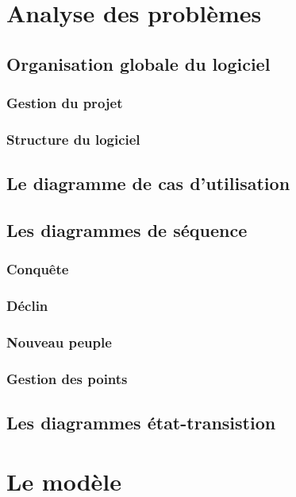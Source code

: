 \documentclass[11pt]{report}
\begin{document}
\chapter{Analyse des problèmes}

	\section{Organisation globale du logiciel}

		\subsection{Gestion du projet}

		\subsection{Structure du logiciel}

	\section{Le diagramme de cas d'utilisation}

	\section{Les diagrammes de séquence}

		\subsection{Conquête}

		\subsection{Déclin}

		\subsection{Nouveau peuple}

		\subsection{Gestion des points}

	\section{Les diagrammes état-transistion}

\chapter{Le modèle}
\end{document}
